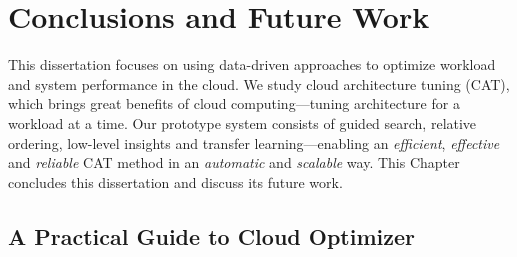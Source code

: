 \chapter{Conclusions and Future Work}
\label{chapter:conclusion}

This dissertation focuses on using data-driven approaches
to optimize workload and system performance in the cloud.
We study cloud architecture tuning (CAT), which brings great benefits
of cloud computing---tuning architecture for a workload at a time.
Our prototype system \scout consists of
guided search, relative ordering, low-level insights and
transfer learning---enabling
an \emph{efficient}, \emph{effective} and \emph{reliable} CAT method
in an \emph{automatic} and \emph{scalable} way.
This Chapter concludes this dissertation and discuss its future work.

\section{A Practical Guide to Cloud Optimizer}
\label{sec:guide}


